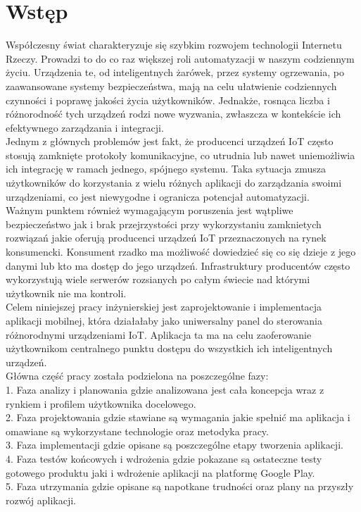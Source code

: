 \section{Wstęp}
Współczesny świat charakteryzuje się szybkim rozwojem technologii Internetu Rzeczy. Prowadzi to do co raz większej roli automatyzacji w naszym codziennym życiu. Urządzenia te, od inteligentnych żarówek, przez systemy ogrzewania, po zaawansowane systemy bezpieczeństwa, mają na celu ułatwienie codziennych czynności i poprawę jakości życia użytkowników. Jednakże, rosnąca liczba i różnorodność tych urządzeń rodzi nowe wyzwania, zwłaszcza w kontekście ich efektywnego zarządzania i integracji.\\

Jednym z głównych problemów jest fakt, że producenci urządzeń IoT często stosują zamknięte protokoły komunikacyjne, co utrudnia lub nawet uniemożliwia ich integrację w ramach jednego, spójnego systemu. Taka sytuacja zmusza użytkowników do korzystania z wielu różnych aplikacji do zarządzania swoimi urządzeniami, co jest niewygodne i ogranicza potencjał automatyzacji.\\

Ważnym punktem również wymagającym poruszenia jest wątpliwe bezpieczeństwo jak i brak przejrzystości przy wykorzystaniu zamknietych rozwiązań jakie oferują producenci urządzeń IoT przeznaczonych na rynek konsumencki. Konsument rzadko ma możliwość dowiedzieć się co się dzieje z jego danymi lub kto ma dostęp do jego urządzeń. Infrastruktury producentów często wykorzystują wiele serwerów rozsianych po całym świecie nad którymi użytkownik nie ma kontroli.\\

Celem niniejszej pracy inżynierskiej jest zaprojektowanie i implementacja aplikacji mobilnej, która działałaby jako uniwersalny panel do sterowania różnorodnymi urządzeniami IoT. Aplikacja ta ma na celu zaoferowanie użytkownikom centralnego punktu dostępu do wszystkich ich inteligentnych urządzeń.\\

Główna część pracy została podzielona na poszczególne fazy:\\

1. Faza analizy i planowania gdzie analizowana jest cała koncepcja wraz z rynkiem i profilem użytkownika docelowego.\\

2. Faza projektowania gdzie stawiane są wymagania jakie spełnić ma aplikacja i omawiane są wykorzystane technologie oraz metodyka pracy.\\

3. Faza implementacji gdzie opisane są poszczególne etapy tworzenia aplikacji.\\

4. Faza testów końcowych i wdrożenia gdzie pokazane są ostateczne testy gotowego produktu jaki i wdrożenie aplikacji na platformę Google Play.\\

5. Faza utrzymania gdzie opisane są napotkane trudności oraz plany na przyszły rozwój aplikacji.\\